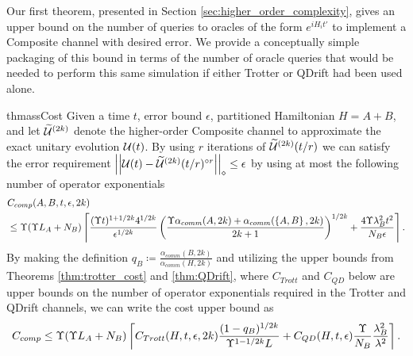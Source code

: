Our first theorem, presented in Section \ref{sec:higher_order_complexity}, gives an upper bound on the number of queries to oracles of the form $e^{i H_i t'}$ to implement a Composite channel with desired error. We provide a conceptually simple packaging of this bound in terms of the number of oracle queries that would be needed to perform this same simulation if either Trotter or QDrift had been used alone.
\begin{restatable}{thm}{assCost} \label{thm:higher_order_cost_fixed}
Given a time $t$, error bound $\epsilon$, partitioned Hamiltonian $H = A + B$, and let $\widetilde{\mathcal{U}}^{(2k)}$ denote the higher-order Composite channel to approximate the exact unitary evolution $\mathcal{U}(t)$. By using $r$ iterations of $\widetilde{\mathcal{U}}^{(2k)}(t/r)$ we can satisfy the error requirement $\left| \left| \mathcal{U}(t) - \widetilde{\mathcal{U}}^{(2k)}(t/r)^{\circ r} \right| \right|_\diamond \leq \epsilon$ by using at most the following number of operator exponentials
\begin{align}
    &C_{comp}(A,B, t, \epsilon, 2k) \nonumber \\
    &\leq \Upsilon (\Upsilon L_A + N_B) \left\lceil \frac{(\Upsilon t)^{1 + 1/2k} 4^{1/2k}}{\epsilon^{1/2k}} \left( \frac{\Upsilon \alpha_{comm}(A, 2k) + \alpha_{comm}(\left\{ A,B \right\}, 2k)}{2k+1} \right)^{1/2k} + \frac{4 \Upsilon \lambda_B^2 t^2}{N_B \epsilon} \right\rceil.
\end{align}
By making the definition $q_B \coloneqq\frac{\alpha_{comm}(B,2k)}{\alpha_{comm}(H, 2k)}$ and utilizing the upper bounds from Theorems \ref{thm:trotter_cost} and \ref{thm:QDrift}, where $C_{Trott}$ and $C_{QD}$ below are  upper bounds on the number of operator exponentials required in the Trotter and QDrift channels, we can write the cost upper bound as
\begin{align}
    C_{comp} \leq \Upsilon (\Upsilon L_A + N_B) \left\lceil C_{Trott}(H, t, \epsilon, 2k) \frac{(1-q_B)^{1/2k}}{\Upsilon^{1- 1/2k}L} + C_{QD}(H, t, \epsilon) \frac{\Upsilon}{N_B} \frac{\lambda_B^2}{\lambda^2} \right\rceil.
\end{align}
\end{restatable}

